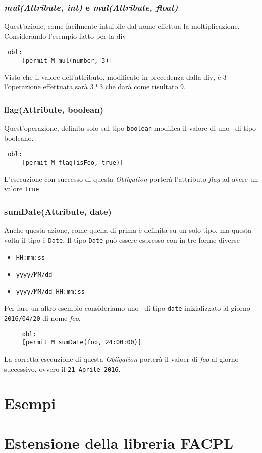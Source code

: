 \subsubsection*{\textit{mul(Attribute, int)} e \textit{mul(Attribute, float)}} %
\label{ssub:opdiv}
Quest'azione, come facilmente intuibile dal nome effettua la moltiplicazione.
Considerando l'esempio fatto per la div
\begin{verbatim}
 obl:
     [permit M mul(number, 3)]
\end{verbatim}
Visto che il valore dell'attributo, modificato in precedenza dalla div, è 3 l'operazione effettuata sarà $3*3$ che darà come risultato 9.



\subsubsection*{flag(Attribute, boolean)} %
\label{ssub:opflag}
Quest'operazione, definita solo sul tipo \texttt{boolean} modifica il valore di uno \statusattribute \ di tipo booleano.
\begin{verbatim}
 obl:
     [permit M flag(isFoo, true)]
\end{verbatim}
L'esecuzione con successo di questa \textit{Obligation} porterà l'attributo \textit{flag} ad avere un valore \texttt{true}.

\subsubsection*{sumDate(Attribute, date)}
\label{ssub:opdate}

Anche questa azione, come quella di prima è definita su un solo tipo, ma questa volta il tipo è \texttt{Date}. Il tipo \texttt{Date} può essere espresso con in tre forme diverse
\begin{itemize}
\item{\texttt{HH:mm:ss}}
\item{\texttt{yyyy/MM/dd}}
\item{\texttt{yyyy/MM/dd-HH:mm:ss}}
\end{itemize}
Per fare un altro esempio consideriamo uno \statusattribute \ di tipo \texttt{date} inizializzato al giorno \texttt{2016/04/20} di nome \textit{foo}.
\begin{verbatim}
	 obl:
     [permit M sumDate(foo, 24:00:00)]
\end{verbatim}
La corretta esecuzione di questa \textit{Obligation} porterà il valoer di \textit{foo} al giorno successivo, ovvero il \texttt{21 Aprile 2016}.



\section{Esempi} %
\label{sec:esempi}



\section{Estensione della libreria FACPL} %
\label{sec:estensione_della_libreria_facpl}

